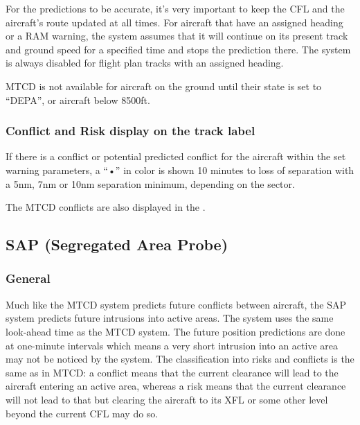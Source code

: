 \documentclass[a4paper,oneside,11pt]{memoir}
\begin{document}
\bigskip

For the predictions to be accurate, it’s very important to keep the CFL and the aircraft’s route updated at all times. For aircraft that have an assigned heading or a RAM warning, the system assumes that it will continue on its present track and ground speed for a specified time and stops the prediction there. The system is always disabled for flight plan tracks with an assigned heading.

\bigskip

MTCD is not available for aircraft on the ground until their state is set to “DEPA”, or aircraft below 8500ft.

\subsubsection*{Conflict and Risk display on the track label}

If there is a conflict or potential predicted conflict for the aircraft within the set warning parameters, a “•” in  color is shown 10 minutes to loss of separation with a 5nm, 7nm or 10nm separation minimum, depending on the sector.

\bigskip

The MTCD conflicts are also displayed in the .

\subsection{SAP (Segregated Area Probe)}
\label{tool:SAP}
\subsubsection*{General}

Much like the MTCD system predicts future conflicts between aircraft, the SAP system predicts future intrusions into active areas. The system uses the same look-ahead time as the MTCD system. The future position predictions are done at one-minute intervals which means a very short intrusion into an active area may not be noticed by the system. The classification into risks and conflicts is the same as in MTCD: a conflict means that the current clearance will lead to the aircraft entering an active area, whereas a risk means that the current clearance will not lead to that but clearing the aircraft to its XFL or some other level beyond the current CFL may do so.

\bigskip
\end{document}
